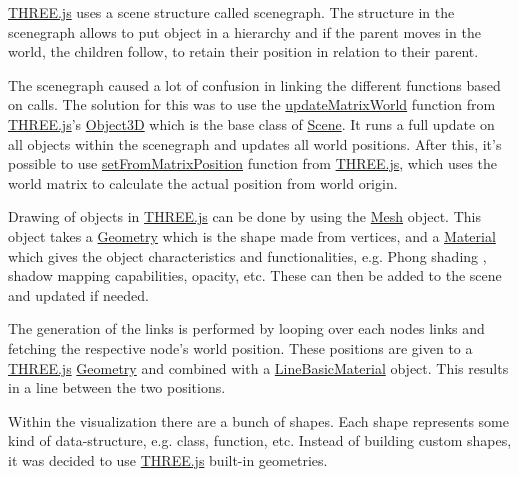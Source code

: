 



\href{https://threejs.org/}{THREE.js} uses a scene structure called \gls{scenegraph}. The structure in the \gls{scenegraph} allows to put object in a hierarchy and if the parent moves in the world, the children follow, to retain their position in relation to their parent. 

The \gls{scenegraph} caused a lot of confusion in linking the different functions based on calls. The solution for this was to use the \href{https://threejs.org/docs/#api/en/core/Object3D.updateMatrixWorld}{updateMatrixWorld} function from \href{https://threejs.org/}{THREE.js}'s \href{https://threejs.org/docs/#api/en/core/Object3D}{Object3D} which is the base class of \href{https://threejs.org/docs/#api/en/scenes/Scene}{Scene}. It runs a full update on all objects within the \gls{scenegraph} and updates all world positions. After this, it's possible to use \href{https://threejs.org/docs/#api/en/math/Vector3.setFromMatrixPosition}{setFromMatrixPosition} function from \href{https://threejs.org/}{THREE.js}, which uses the world matrix to calculate the actual position from world origin. 

Drawing of objects in \href{https://threejs.org/}{THREE.js} can be done by using the \href{https://threejs.org/docs/#api/en/objects/Mesh}{Mesh} object. This object takes a \href{https://threejs.org/docs/#api/en/core/Geometry}{Geometry} which is the shape made from vertices, and a \href{https://threejs.org/docs/#api/en/materials/Material}{Material} which gives the object characteristics and functionalities, e.g. Phong shading \cite{acm:phongShading1986article}, shadow mapping \cite{acm:perspectiveShadowMap2002article} capabilities, opacity, etc. These can then be added to the scene and updated if needed. 

The generation of the links is performed by looping over each nodes links and fetching the respective node's world position. These positions are given to a \href{https://threejs.org/}{THREE.js} \href{https://threejs.org/docs/#api/en/core/Geometry}{Geometry} and combined with a \href{https://threejs.org/docs/#api/en/materials/LineBasicMaterial}{LineBasicMaterial} object. This results in a line between the two positions. %

Within the visualization there are a bunch of shapes. Each shape represents some kind of data-structure, e.g. class, function, etc. Instead of building custom shapes, it was decided to use \href{https://threejs.org/}{THREE.js} built-in geometries. 

